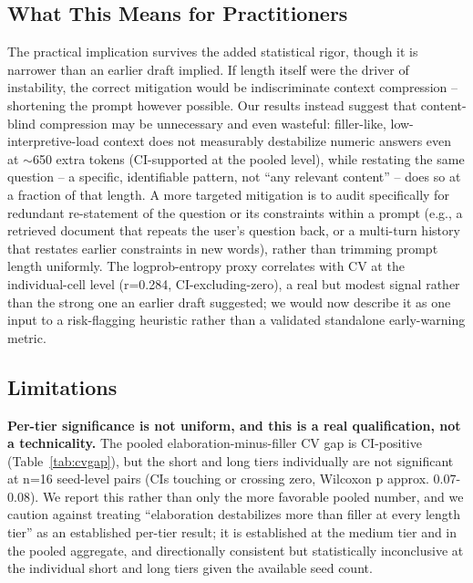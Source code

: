 \documentclass[11pt,letterpaper]{article}
\begin{document}
\subsection{What This Means for Practitioners}

The practical implication survives the added statistical rigor, though it is narrower than an earlier draft implied. If length itself were the driver of instability, the correct mitigation would be indiscriminate context compression -- shortening the prompt however possible. Our results instead suggest that content-blind compression may be unnecessary and even wasteful: filler-like, low-interpretive-load context does not measurably destabilize numeric answers even at $\sim$650 extra tokens (CI-supported at the pooled level), while restating the same question -- a specific, identifiable pattern, not ``any relevant content'' -- does so at a fraction of that length. A more targeted mitigation is to audit specifically for redundant re-statement of the question or its constraints within a prompt (e.g., a retrieved document that repeats the user's question back, or a multi-turn history that restates earlier constraints in new words), rather than trimming prompt length uniformly. The logprob-entropy proxy correlates with CV at the individual-cell level (r=0.284, CI-excluding-zero), a real but modest signal rather than the strong one an earlier draft suggested; we would now describe it as one input to a risk-flagging heuristic rather than a validated standalone early-warning metric.

\subsection{Limitations}
\label{sec:limitations}

\textbf{Per-tier significance is not uniform, and this is a real qualification, not a technicality.} The pooled elaboration-minus-filler CV gap is CI-positive (Table~\ref{tab:cvgap}), but the short and long tiers individually are not significant at n=16 seed-level pairs (CIs touching or crossing zero, Wilcoxon p approx. 0.07-0.08). We report this rather than only the more favorable pooled number, and we caution against treating ``elaboration destabilizes more than filler at every length tier'' as an established per-tier result; it is established at the medium tier and in the pooled aggregate, and directionally consistent but statistically inconclusive at the individual short and long tiers given the available seed count.
\end{document}
